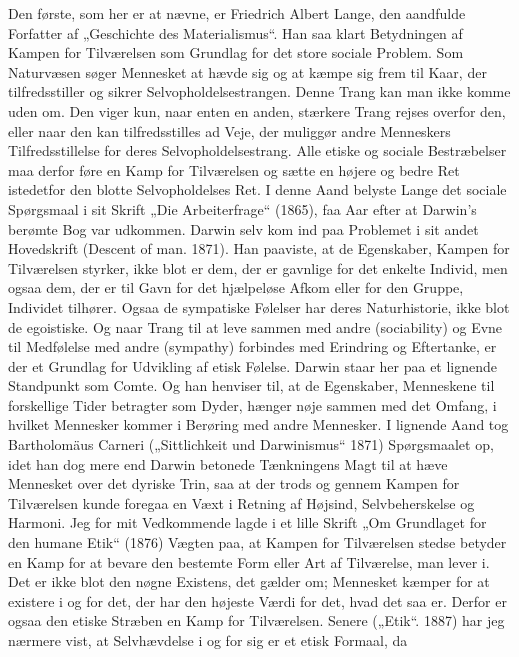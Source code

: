 \documentclass[12pt,a4paper,openany]{book}
\newcommand{\opage}[1]{\marginnote{\footnotesize\textit{[#1]}}}
\begin{document}
Den første, som her er at nævne, er Friedrich Albert Lange, den
aandfulde Forfatter af „Geschichte des Materialismus“. Han saa klart
Betydningen af Kampen for Tilværelsen som Grundlag for det store
sociale Problem. Som Naturvæsen søger Mennesket at hævde sig og
at kæmpe sig frem til Kaar, der tilfredsstiller og sikrer Selvopholdelsestrangen.
Denne Trang kan man ikke komme uden om. Den
viger kun, naar enten en anden, stærkere Trang rejses overfor den,
eller naar den kan tilfredsstilles ad Veje, der muliggør andre Menneskers
Tilfredsstillelse for deres Selvopholdelsestrang. Alle etiske og
sociale Bestræbelser maa derfor føre en Kamp for Tilværelsen og
sætte en højere og bedre Ret istedetfor den blotte Selvopholdelses
Ret. I denne Aand belyste Lange det sociale Spørgsmaal i sit Skrift
\opage{75}„Die Arbeiterfrage“ (1865), faa Aar efter at Darwin’s berømte Bog
var udkommen. Darwin selv kom ind paa Problemet i sit andet
Hovedskrift (Descent of man. 1871). Han paaviste, at de Egenskaber,
Kampen for Tilværelsen styrker, ikke blot er dem, der er gavnlige
for det enkelte Individ, men ogsaa dem, der er til Gavn for det hjælpeløse
Afkom eller for den Gruppe, Individet tilhører. Ogsaa de sympatiske
Følelser har deres Naturhistorie, ikke blot de egoistiske. Og
naar Trang til at leve sammen med andre (sociability) og Evne til
Medfølelse med andre (sympathy) forbindes med Erindring og Eftertanke,
er der et Grundlag for Udvikling af etisk Følelse. Darwin
staar her paa et lignende Standpunkt som Comte. Og han henviser
til, at de Egenskaber, Menneskene til forskellige Tider betragter som
Dyder, hænger nøje sammen med det Omfang, i hvilket Mennesker
kommer i Berøring med andre Mennesker. I lignende Aand tog
Bartholomäus Carneri („Sittlichkeit und Darwinismus“ 1871)
Spørgsmaalet op, idet han dog mere end Darwin betonede Tænkningens
Magt til at hæve Mennesket over det dyriske Trin,
saa at der trods og gennem Kampen for Tilværelsen kunde foregaa
en Væxt i Retning af Højsind, Selvbeherskelse og Harmoni. Jeg
for mit Vedkommende lagde i et lille Skrift „Om Grundlaget for den
humane Etik“ (1876) Vægten paa, at Kampen for Tilværelsen stedse
betyder en Kamp for at bevare den bestemte Form eller Art af Tilværelse,
man lever i. Det er ikke blot den nøgne Existens, det gælder
om; Mennesket kæmper for at existere i og for det, der har den
højeste Værdi for det, hvad det saa er. Derfor er ogsaa den etiske
Stræben en Kamp for Tilværelsen. Senere („Etik“. 1887) har jeg
nærmere vist, at Selvhævdelse i og for sig er et etisk Formaal, da
\end{document}
